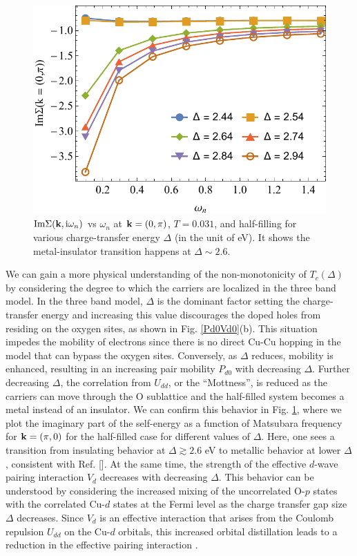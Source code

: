 \documentclass[reprint,nofootinbib,nobibnotes,amsmath,amssymb,aps,prb,floatfix]{revtex4-2}
\newcommand{\refdisp}[1]{Ref. [\onlinecite{#1}]}
\newcommand{\figdisp}[1]{Fig. \ref{#1}}
\begin{document}
\begin{figure}[ht]
\includegraphics[width=0.88\columnwidth]{Imsigmavsw.pdf}
\caption{$\mathrm{Im}\Sigma({\bf k},\text{i}\omega_n)$ vs $\omega_n$ at ${\bf k}=(0,\pi)$, $T=0.031$, and half-filling for various charge-transfer energy $\Delta$ (in the unit of eV). It shows the metal-insulator transition happens at $\Delta \sim 2.6$.}
\label{imsigma2by2}
\end{figure}

We can gain a more physical understanding of the non-monotonicity of $T_c(\Delta)$ by considering the degree to which the carriers are localized in the three band model. In the three band model, $\Delta$ is the dominant factor setting the charge-transfer energy and increasing this value discourages the doped holes from residing on the oxygen sites, as shown in \figdisp{Pd0Vd0}(b). 
This situation impedes the mobility of electrons since there is no direct Cu-Cu hopping in the model that can bypass the oxygen sites. Conversely, as $\Delta$ reduces, mobility is enhanced, resulting in an increasing pair mobility $P_{d0}$ with decreasing $\Delta$. Further decreasing $\Delta$, the correlation from $U_{dd}$, or the ``Mottness'', is reduced as the carriers can move through the O sublattice and the half-filled system becomes a metal \cite{ZSA} instead of an insulator. We can confirm this behavior in \figdisp{imsigma2by2}, where we plot the imaginary part of the self-energy as a function of Matsubara frequency for ${\bf k}=(\pi,0)$ for the half-filled case for different values of $\Delta$. Here, one sees a transition from insulating behavior at $\Delta \gtrsim 2.6$ eV to metallic behavior at lower $\Delta$, consistent with \refdisp{Vitali}. At the same time, the strength of the effective $d$-wave pairing interaction $V_d$ decreases with decreasing $\Delta$. This behavior can be understood by considering the increased mixing of the uncorrelated O-$p$ states with the correlated Cu-$d$ states at the Fermi level as the charge transfer gap size $\Delta$ decreases. Since $V_d$ is an effective interaction that arises from the Coulomb repulsion $U_{dd}$ on the Cu-$d$ orbitals, this increased orbital distillation leads to a reduction in the effective pairing interaction \cite{Sakakibara}.   
\end{document}
